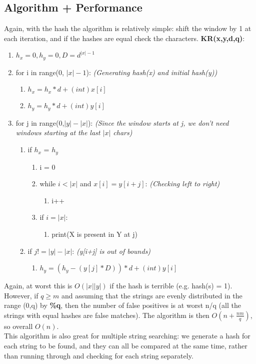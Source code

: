 \subsection{Algorithm + Performance}
Again, with the hash the algorithm is relatively simple: shift the window by 1 at each iteration, and if the hashes are equal check the characters.
\textbf{KR(x,y,d,q)}:
\begin{enumerate}[label=\Alph*]
    \item \(h_x=0, h_y=0, D = d^{|x|-1}  \)
    \item for i in range(0, $|x|-1$): \emph{(Generating hash(x) and initial hash(y))}
    \begin{enumerate}
        \item \(h_x = h_x * d + (int) x[i] \)
        \item \(h_y = h_y * d + (int) y[i] \)
    \end{enumerate}    
    \item for j in range(0,\(|y|-|x|\)): \emph{(Since the window starts at j, we don't need windows starting at the last $|x|$ chars)}
\begin{enumerate}[label=\arabic*]
    \item if $h_x$ = $h_y$
    \begin{enumerate}
        \item i = 0
        \item while $i < |x|$ and $x[i]=y[i+j]$: \emph{(Checking left to right)}
        \begin{enumerate}
            \item [] i++
        \end{enumerate}      
        \item if $i = |x|$: 
        \begin{enumerate}
           \item print(X is present in Y at j)
        \end{enumerate}          
    \end{enumerate}
    \item if \(j!= |y|-|x|\): \emph{(y[i+j] is out of bounds)}
    \begin{enumerate}
        \item \(h_y = (h_y - (y[j]* D) )* d + (int) y[i] \)
    \end{enumerate}  
\end{enumerate}    
\end{enumerate}
Again, at worst this is $O(|x||y|)$ if the hash is terrible (e.g. hash(s) = 1). However, if $q \geq m$ and assuming that the strings are evenly distributed in the range (0,q) by \textbf{\%q}, then the number of false positives is at worst n/q (all the strings with equal hashes are false matches). The algorithm is then $O(n + \frac{nm}{q})$, so overall $O(n)$. \\
This algorithm is also great for multiple string searching: we generate a hash for each string to be found, and they can all be compared at the same time, rather than running through and checking for each string separately. 